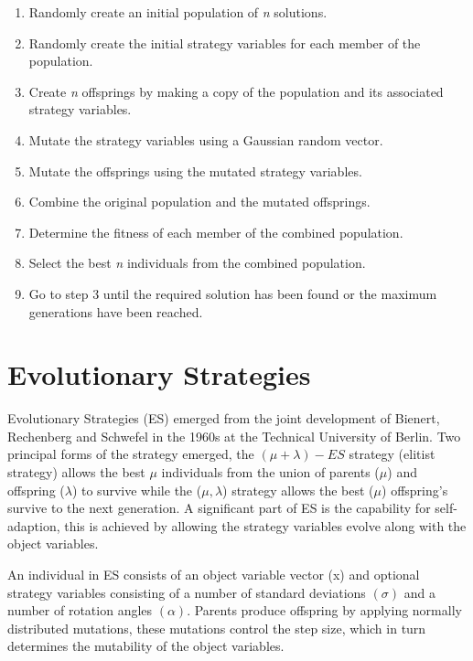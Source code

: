 \begin{center}
\begin{enumerate}
\item Randomly create an initial population of \emph{n} solutions.
\item Randomly create the initial strategy variables for each member of the population. 
\item Create \emph{n} offsprings by making a copy of the population and its associated strategy variables.
\item Mutate the strategy variables using a Gaussian random vector.
\item Mutate the offsprings using the mutated strategy variables.
\item Combine the original population and the mutated offsprings.
\item Determine the fitness of each member of the combined population. 
\item Select the best \emph{n} individuals from the combined population.
\item Go to step 3 until the required solution has been found or the maximum generations  have been reached. 
\end{enumerate}
\end{center}



\section{Evolutionary Strategies}
\label{es}Evolutionary Strategies (ES) emerged from the joint development of Bienert, Rechenberg and Schwefel in the 1960s at the Technical University of Berlin. Two principal forms of the strategy emerged, the $(\mu + \lambda)-ES$ strategy (elitist strategy) allows the best $\mu$ individuals from the union of parents ($\mu$) and offspring ($\lambda$) to survive while the ($\mu,\lambda$) strategy allows the best ($\mu$) offspring's survive to the next generation. A significant part of ES is the capability for self-adaption, this is achieved by allowing the strategy variables evolve along with the object variables.

An individual in ES consists of an object variable vector (x) and optional strategy variables consisting of a number of standard deviations $(\sigma)$ and a number of rotation angles $(\alpha)$. Parents produce offspring by applying normally distributed mutations, these mutations control the step size, which in turn determines the mutability of the object variables.


